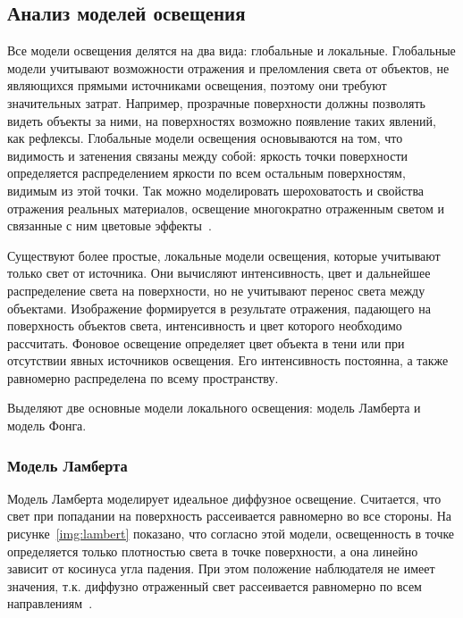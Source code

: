 \subsection{Анализ моделей освещения}

Все модели освещения делятся на два вида: глобальные и локальные. 
Глобальные модели учитывают возможности отражения и преломления света от объектов, не являющихся прямыми источниками освещения, поэтому они требуют значительных затрат.
Например, прозрачные поверхности должны позволять видеть объекты за ними, на поверхностях возможно появление таких явлений, как
рефлексы.
Глобальные модели освещения основываются на том, что видимость и затенения связаны между собой: яркость точки поверхности определяется распределением яркости по всем остальным поверхностям, видимым из этой точки. 
Так можно моделировать шероховатость и свойства отражения реальных материалов, освещение многократно отраженным светом и связанные с ним цветовые эффекты~\cite{light-model}.

Существуют более простые, локальные модели освещения, которые учитывают только свет от источника. 
Они вычисляют интенсивность, цвет и дальнейшее распределение света на поверхности, но не учитывают перенос света между объектами. 
Изображение формируется в результате отражения, падающего на поверхность объектов света, интенсивность и цвет которого необходимо рассчитать.
Фоновое освещение определяет цвет объекта в тени или при отсутствии явных источников освещения. Его интенсивность постоянна, а также равномерно распределена по всему пространству. 

Выделяют две основные модели локального освещения: модель Ламберта и модель Фонга.

\subsubsection{Модель Ламберта}
Модель Ламберта моделирует идеальное диффузное освещение. Считается, что свет при попадании на поверхность рассеивается равномерно во все стороны.
На рисунке~\ref{img:lambert} показано, что согласно этой модели, освещенность в точке определяется только плотностью света в точке поверхности, а она линейно зависит от косинуса угла падения. 
При этом положение наблюдателя не имеет значения, т.к. диффузно отраженный свет рассеивается равномерно по всем направлениям~\cite{light-model}.

